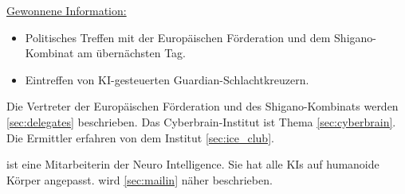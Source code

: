 \begin{remarks}
	\underline{Gewonnene Information:}
	
	\begin{itemize}
		\item Politisches Treffen mit der Europäischen Förderation und dem Shigano-Kombinat am übernächsten Tag.
		\item Eintreffen von KI-gesteuerten Guardian-Schlachtkreuzern.
	\end{itemize}

	Die Vertreter der Europäischen Förderation und des Shigano-Kombinats werden \cref{sec:delegates} beschrieben.
	Das Cyberbrain-Institut ist Thema \cref{sec:cyberbrain}. Die Ermittler erfahren von dem Institut
	\cref{sec:ice_club}.

	\ml{} ist eine Mitarbeiterin der Neuro Intelligence. Sie hat alle KIs auf humanoide Körper angepasst. \ml{} wird
	\cref{sec:mailin} näher beschrieben.
\end{remarks}
